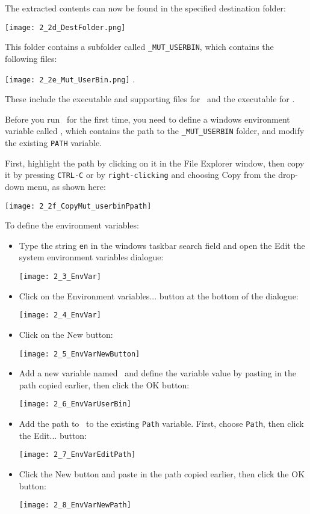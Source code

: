 The extracted contents can now be found in the specified destination folder:

        \texttt{[image: 2\_2d\_DestFolder.png]}

This folder contains a subfolder called \texttt{\_MUT\_USERBIN}, which contains the following files:


        \texttt{[image: 2\_2e\_Mut\_UserBin.png]} \label{page:userbin}
        \label{page:userbin}.


These include the executable and supporting files for \mut\ and the executable for \mfus.

Before you run \mut\ for the first time, you need to define a windows environment variable called \bin, which contains the path to the \texttt{\_MUT\_USERBIN} folder, and modify the existing \texttt{PATH} variable.

First,  highlight the path by clicking on it in the File Explorer window, then copy it by pressing {\tt CTRL-C} or by {\tt right-clicking} and choosing {\sf Copy} from the drop-down menu, as shown here:

        \texttt{[image: 2\_2f\_CopyMut\_userbinPpath]}


To define the environment variables:
\begin{itemize}
     \item Type the string {\tt en} in the windows taskbar search field and open the {\sf Edit the system environment variables} dialogue:

        \texttt{[image: 2\_3\_EnvVar]}

     \item Click on the {\sf Environment variables...} button at the bottom of the dialogue:

        \texttt{[image: 2\_4\_EnvVar]}


     \item Click on the {\sf New} button:

        \texttt{[image: 2\_5\_EnvVarNewButton]}

     \item Add a new variable named \bin\ and define the variable value by pasting in the path copied earlier, then click the {\sf OK} button:

        \texttt{[image: 2\_6\_EnvVarUserBin]}

     \item Add the path to \bin\ to the existing \texttt{Path} variable.  First, choose \texttt{Path}, then click the {\sf Edit...} button:

        \texttt{[image: 2\_7\_EnvVarEditPath]}

     \item Click the {\sf New} button and paste in the path copied earlier, then click the {\sf OK} button:

        \texttt{[image: 2\_8\_EnvVarNewPath]}

\end{itemize}

